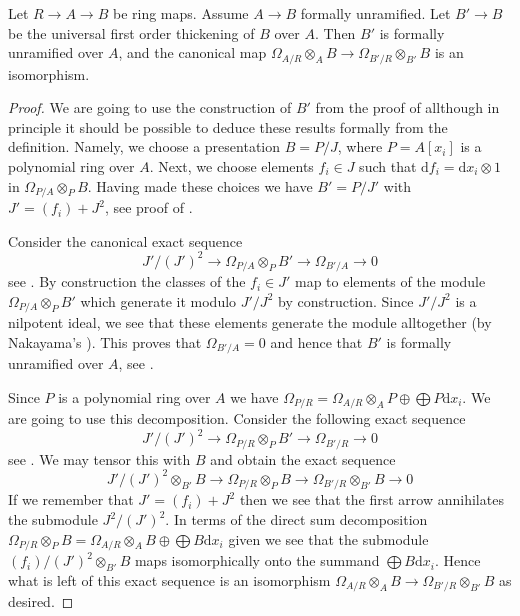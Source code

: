 \begin{lemma}
\label{lemma-differentials-universal-thickening}
Let $R \to A  \to B$ be ring maps. Assume $A \to B$ formally unramified.
Let $B' \to B$ be the universal first order thickening of $B$ over $A$.
Then $B'$ is formally unramified over $A$, and the canonical map
$\Omega_{A/R} \otimes_A B \to \Omega_{B'/R} \otimes_{B'} B$ is an
isomorphism.
\end{lemma}

\begin{proof}
We are going to use the construction of $B'$ from the proof of
allthough in principle it should be possible to deduce these results
formally from the definition. Namely, we choose a presentation
$B = P/J$, where $P = A[x_i]$ is a polynomial ring over $A$.
Next, we choose elements $f_i \in J$ such that
$\text{d}f_i = \text{d}x_i \otimes 1$ in $\Omega_{P/A} \otimes_P B$.
Having made these choices we have
$B' = P/J'$ with $J' = (f_i) + J^2$, see proof of
.

\medskip\noindent
Consider the canonical exact sequence
$$
J'/(J')^2 \to \Omega_{P/A} \otimes_P B' \to \Omega_{B'/A} \to 0
$$
see
.
By construction the classes of the $f_i \in J'$ map to elements of
the module $\Omega_{P/A} \otimes_P B'$ which generate it modulo
$J'/J^2$ by construction. Since $J'/J^2$ is a nilpotent ideal, we see
that these elements generate the module alltogether (by
Nakayama's ). This proves that $\Omega_{B'/A} = 0$
and hence that $B'$ is formally unramified over $A$, see
.

\medskip\noindent
Since $P$ is a polynomial ring over $A$ we have
$\Omega_{P/R} = \Omega_{A/R} \otimes_A P \oplus \bigoplus P\text{d}x_i$.
We are going to use this decomposition.
Consider the following exact sequence
$$
J'/(J')^2 \to
\Omega_{P/R} \otimes_P B' \to
\Omega_{B'/R} \to 0
$$
see
.
We may tensor this with $B$ and obtain the exact sequence
$$
J'/(J')^2 \otimes_{B'} B \to
\Omega_{P/R} \otimes_P B \to
\Omega_{B'/R} \otimes_{B'} B \to 0
$$
If we remember that $J' = (f_i) + J^2$
then we see that the first arrow annihilates the submodule $J^2/(J')^2$.
In terms of the direct sum decomposition
$\Omega_{P/R} \otimes_P B =
\Omega_{A/R} \otimes_A B \oplus \bigoplus B\text{d}x_i $ given
we see that the submodule $(f_i)/(J')^2 \otimes_{B'} B$ maps
isomorphically onto the summand $\bigoplus B\text{d}x_i$. Hence what is
left of this exact sequence is an isomorphism
$\Omega_{A/R} \otimes_A B \to \Omega_{B'/R} \otimes_{B'} B$
as desired.
\end{proof}









